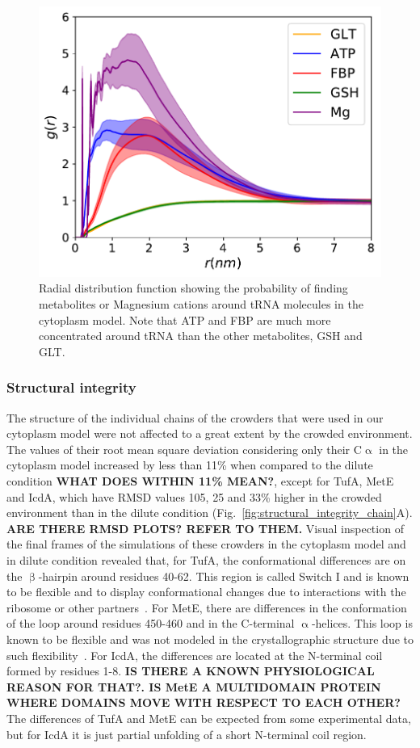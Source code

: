 \documentclass[journal=jcisd8,manuscript=article]{achemso}
\begin{document}
\begin{figure}[H]
\includegraphics[scale=0.5]{rdf_RNA_metabolites.pdf}
\caption{Radial distribution function showing the probability of
  finding metabolites or Magnesium cations around tRNA molecules in
  the cytoplasm model. Note that ATP and FBP are much more
  concentrated around tRNA than the other metabolites, GSH and GLT.}
\label{fig:tRNA_aggregation}
\end{figure}


\subsubsection{Structural integrity}
The structure of the individual chains of the crowders that were used
in our cytoplasm model were not affected to a great extent by the
crowded environment. The values of their root mean square deviation considering only
their C$\upalpha$ in the cytoplasm model {\color{blue} increased by less than 11\% when compared to the dilute condition} {\bf WHAT DOES WITHIN 11\% MEAN?}, except for
TufA, MetE and IcdA, which have RMSD values 105, 25 and 33\% higher in
the crowded environment than in the dilute condition {\color{blue}(Fig.~\ref{fig:structural_integrity_chain}A)}. {\bf ARE THERE
  RMSD PLOTS? REFER TO THEM.} {\color{blue} Visual inspection of the final frames of the simulations of these crowders in the cytoplasm model and in dilute condition revealed that, for TufA, the conformational differences are on the $\upbeta$-hairpin around residues 40-62. This region is called Switch I and is known to be flexible and to display conformational changes due to interactions with the ribosome or other partners~\cite{Abel1996}. For MetE, there are differences in the conformation of the loop around residues 450-460 and in the C-terminal $\upalpha$-helices. This loop is known to be flexible and was not modeled in the crystallographic structure due to such flexibility~\cite{Ferrer2004}. For IcdA, the differences are located at the N-terminal coil formed by residues 1-8.} {\bf IS THERE A KNOWN PHYSIOLOGICAL REASON FOR THAT?. IS
  MetE A MULTIDOMAIN PROTEIN WHERE DOMAINS MOVE WITH RESPECT TO EACH
  OTHER?} {\color{blue} The differences of TufA and MetE can be expected from some experimental data, but for IcdA it is just partial unfolding of a short N-terminal coil region.}
\end{document}
